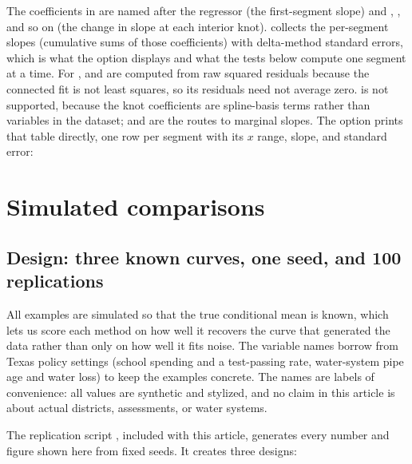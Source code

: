\noindent
The coefficients in  are named after the regressor (the
first-segment slope) and , , and so on (the change
in slope at each interior knot).   collects the per-segment
slopes (cumulative sums of those coefficients) with delta-method standard
errors, which is what the  option displays and what the
 tests below compute one segment at a time.  For
,  and  are computed from
raw squared residuals because the connected fit is not least squares, so its
residuals need not average zero.   is not supported, because
the knot coefficients are spline-basis terms rather than variables in the
dataset;  and  are the routes to marginal
slopes.  The  option prints that table directly, one row per
segment with its $x$ range, slope, and standard error:

\begin{stlog}
\nullskip
\end{stlog}

\section{Simulated comparisons}
\label{sec:sims}

\subsection{Design: three known curves, one seed, and 100 replications}

All examples are simulated so that the true conditional mean is known, which
lets us score each method on how well it recovers the curve that generated
the data rather than only on how well it fits noise.  The variable names borrow from Texas policy settings (school
spending and a test-passing rate, water-system pipe age and water loss) to
keep the examples concrete.  The names are labels of convenience: all values
are synthetic and stylized, and no claim in this article is about actual
districts, assessments, or water systems.

The replication script , included with this article,
generates every number and figure shown here from fixed seeds.  It creates
three designs:

